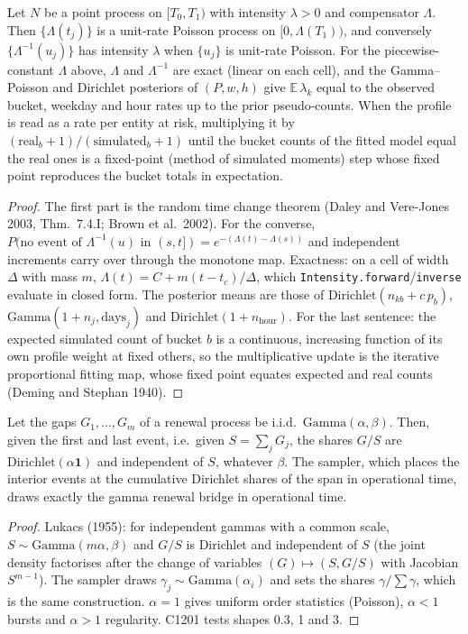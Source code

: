 \begin{proposition}\label{prop:tschange}
Let $N$ be a point process on $[T_0,T_1)$ with intensity $\lambda>0$ and compensator $\Lambda$. Then
$\{\Lambda(t_j)\}$ is a unit-rate Poisson process on $[0,\Lambda(T_1))$, and conversely
$\{\Lambda^{-1}(u_j)\}$ has intensity $\lambda$ when $\{u_j\}$ is unit-rate Poisson. For the piecewise-constant
$\Lambda$ above, $\Lambda$ and $\Lambda^{-1}$ are exact (linear on each cell), and the Gamma--Poisson and Dirichlet
posteriors of $(P,w,h)$ give $\mathbb E\,\lambda_k$ equal to the observed bucket, weekday and hour rates up to the
prior pseudo-counts. When the profile is read as a rate per entity at risk, multiplying it by
$(\text{real}_b+1)/(\text{simulated}_b+1)$ until the bucket counts of the fitted model equal the real ones is a
fixed-point (method of simulated moments) step whose fixed point reproduces the bucket totals in expectation.
\end{proposition}
\begin{proof}
The first part is the random time change theorem (Daley and Vere-Jones 2003, Thm.~7.4.I; Brown et al.\ 2002). For
the converse, $P(\text{no event of }\Lambda^{-1}(u)\text{ in }(s,t])=e^{-(\Lambda(t)-\Lambda(s))}$ and independent
increments carry over through the monotone map. Exactness: on a cell of width $\Delta$ with mass $m$,
$\Lambda(t)=C+m(t-t_c)/\Delta$, which \texttt{Intensity.forward}/\texttt{inverse} evaluate in closed form. The
posterior means are those of $\mathrm{Dirichlet}(n_{kb}+c\,p_b)$, $\mathrm{Gamma}(1+n_j,\mathrm{days}_j)$ and
$\mathrm{Dirichlet}(1+n_{\mathrm{hour}})$. For the last sentence: the expected simulated count of bucket $b$ is a
continuous, increasing function of its own profile weight at fixed others, so the multiplicative update is the
iterative proportional fitting map, whose fixed point equates expected and real counts (Deming and Stephan 1940).
\end{proof}

\begin{proposition}\label{prop:tsbridge}
Let the gaps $G_1,\dots,G_m$ of a renewal process be i.i.d.\ $\mathrm{Gamma}(\alpha,\beta)$. Then, given the first
and last event, i.e.\ given $S=\sum_jG_j$, the shares $G/S$ are $\mathrm{Dirichlet}(\alpha\mathbf 1)$ and independent
of $S$, whatever $\beta$. The sampler, which places the interior events at the cumulative Dirichlet shares of the
span in operational time, draws exactly the gamma renewal bridge in operational time.
\end{proposition}
\begin{proof}
Lukacs (1955): for independent gammas with a common scale, $S\sim\mathrm{Gamma}(m\alpha,\beta)$ and $G/S$ is
Dirichlet and independent of $S$ (the joint density factorises after the change of variables
$(G)\mapsto(S,G/S)$ with Jacobian $S^{m-1}$). The sampler draws $\gamma_j\sim\mathrm{Gamma}(\alpha_i)$ and sets the
shares $\gamma/\sum\gamma$, which is the same construction. $\alpha=1$ gives uniform order statistics (Poisson),
$\alpha<1$ bursts and $\alpha>1$ regularity. C1201 tests shapes 0.3, 1 and 3.
\end{proof}

